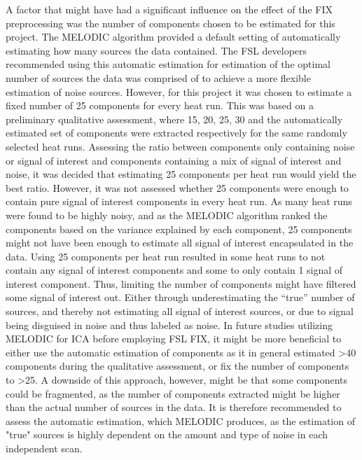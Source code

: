 A factor that might have had a significant influence on the effect of the FIX preprocessing was the number of components chosen to be estimated for this project. The MELODIC algorithm provided a default setting of automatically estimating how many sources the data contained. The FSL developers recommended using this automatic estimation for estimation of the optimal number of sources the data was comprised of to achieve a more flexible estimation of noise sources. However, for this project it was chosen to estimate a fixed number of 25 components for every heat run. This was based on a preliminary qualitative assessment, where 15, 20, 25, 30 and the automatically estimated set of components were extracted respectively for the same randomly selected heat runs. Assessing the ratio between components only containing noise or signal of interest and components containing a mix of signal of interest and noise, it was decided that estimating 25 components per heat run would yield the best ratio. However, it was not assessed whether 25 components were enough to contain pure signal of interest components in every heat run. As many heat runs were found to be highly noisy, and as the MELODIC algorithm ranked the components based on the variance explained by each component, 25 components might not have been enough to estimate all signal of interest encapsulated in the data. Using 25 components per heat run resulted in some heat runs to not contain any signal of interest components and some to only contain 1 signal of interest component. Thus, limiting the number of components might have filtered some signal of interest out. Either through underestimating the “true” number of sources, and thereby not estimating all signal of interest sources, or due to signal being disguised in noise and thus labeled as noise. In future studies utilizing MELODIC for ICA before employing FSL FIX, it might be more beneficial to either use the automatic estimation of components as it in general estimated >40 components during the qualitative assessment, or fix the number of components to >25. A downside of this approach, however, might be that some components could be fragmented, as the number of components extracted might be higher than the actual number of sources in the data. It is therefore recommended to assess the automatic estimation, which MELODIC produces, as the estimation of "true" sources is highly dependent on the amount and type of noise in each independent scan. \\

